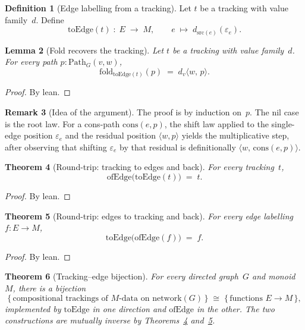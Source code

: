 \documentclass[11pt,a4paper]{article}
\theoremstyle{plain}
\newtheorem{theorem}{Theorem}[section]
\newtheorem{lemma}[theorem]{Lemma}
\theoremstyle{definition}
\newtheorem{definition}[theorem]{Definition}
\newtheorem{remark}[theorem]{Remark}
\newcommand{\src}{\mathrm{src}}
\begin{document}
\begin{definition}[Edge labelling from a tracking]\label{def:to-edge}
Let $t$ be a tracking with value family~$d$. Define
\begin{equation}
  \mathrm{toEdge}(t) \;:\; E \;\longrightarrow\; M,
  \qquad
  e \;\longmapsto\; d_{\src(e)}(\varepsilon_e).
\end{equation}
\end{definition}

\begin{lemma}[Fold recovers the tracking]\label{lem:fold-eq}
Let $t$ be a tracking with value family~$d$. For every path
$p : \mathrm{Path}_G(v,w)$,
\begin{equation}
  \mathrm{fold}_{\mathrm{toEdge}(t)}(p)
  \;=\;
  d_v\bigl\langle w,\, p \bigr\rangle.
\end{equation}
\end{lemma}

\begin{proof}
By lean.
\end{proof}

\begin{remark}[Idea of the argument]
The proof is by induction on~$p$. The nil case is the root law. For a cons-path
$\mathrm{cons}(e,p)$, the shift law applied to the single-edge position
$\varepsilon_e$ and the residual position $\langle w,p \rangle$ yields the
multiplicative step, after observing that shifting $\varepsilon_e$ by that
residual is definitionally $\langle w,\, \mathrm{cons}(e,p) \rangle$.
\end{remark}

\begin{theorem}[Round-trip: tracking to edges and back]\label{thm:of-to}
For every tracking~$t$,
\[
  \mathrm{ofEdge}\bigl(\mathrm{toEdge}(t)\bigr) \;=\; t.
\]
\end{theorem}

\begin{proof}
By lean.
\end{proof}

\begin{theorem}[Round-trip: edges to tracking and back]\label{thm:to-of}
For every edge labelling $f : E \to M$,
\[
  \mathrm{toEdge}\bigl(\mathrm{ofEdge}(f)\bigr) \;=\; f.
\]
\end{theorem}

\begin{proof}
By lean.
\end{proof}

\begin{theorem}[Tracking--edge bijection]\label{thm:tracking-bij}
For every directed graph~$G$ and monoid~$M$, there is a bijection
\begin{equation}
  \bigl\{\,\text{compositional trackings of $M$-data on
    $\mathrm{network}(G)$}\,\bigr\}
  \;\cong\;
  \bigl\{\,\text{functions } E \to M\,\bigr\},
\end{equation}
implemented by $\mathrm{toEdge}$ in one direction and $\mathrm{ofEdge}$ in the
other. The two constructions are mutually inverse by
Theorems~\ref{thm:of-to} and~\ref{thm:to-of}.
\end{theorem}
\end{document}
